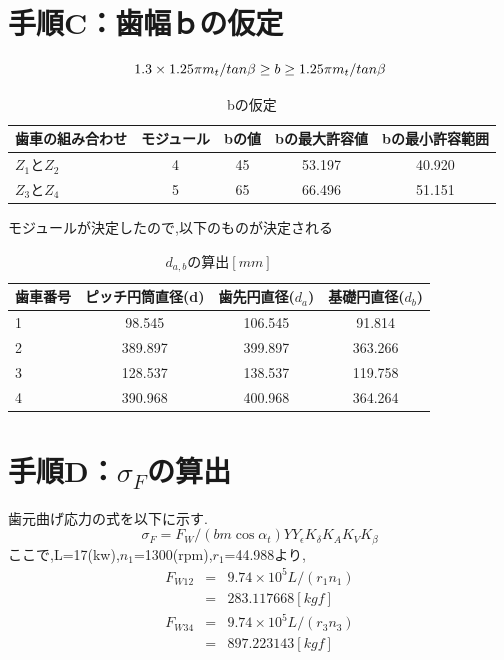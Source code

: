 \section{手順C：歯幅ｂの仮定}
\begin{equation}
1.3\times1.25 \pi m_t /tan{\beta} \geq b \geq 1.25 \pi m_t /tan{\beta}\nonumber\\
\end{equation}
\begin{table}[htb]
\begin{center}
  \caption{bの仮定}
  \begin{tabular}{|l|c|c|c|c|} \hline
    歯車の組み合わせ&モジュール&bの値&bの最大許容値&bの最小許容範囲\\\hline
    $Z_1とZ_2$&4&45&53.197&40.920\\
    $Z_3とZ_4$&5&65&66.496&51.151\\
    \hline
  \end{tabular}
\end{center}
\end{table}

モジュールが決定したので,以下のものが決定される
\begin{table}[htbp]
\begin{center}
  \caption{$d_{a,b}の算出[mm]$}
  \begin{tabular}{|l|c|c|c|} \hline
    歯車番号&ピッチ円筒直径(d)&歯先円直径($d_a$)&基礎円直径($d_b$)\\\hline
1& 98.545&106.545& 91.814\\
2&389.897&399.897&363.266\\
3&128.537&138.537&119.758\\
4&390.968&400.968&364.264\\
    \hline
  \end{tabular}
\end{center}
\end{table}

\section{手順D：$\sigma_F$の算出}
歯元曲げ応力の式を以下に示す.
\begin{equation}
\sigma_F=F_W/(bm\cos{\alpha_t})YY_{\epsilon}K_{\delta}K_AK_VK_{\beta}\nonumber
\end{equation}
ここで,L=17(kw),$n_1$=1300(rpm),$r_1$=44.988より,
\begin{eqnarray}
F_{W12} &=& 9.74\times10^5L/(r_1n_1)\nonumber\\
       &=& 283.117668[kgf]\nonumber\\
F_{W34} &=& 9.74\times10^5L/(r_3n_3)\nonumber\\
       &=& 897.223143[kgf]\nonumber
\end{eqnarray}

